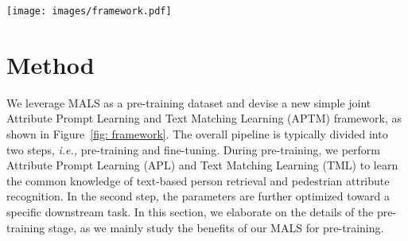 \documentclass[sigconf]{acmart}
\def\ie{\emph{i.e.}}
\begin{document}
\begin{figure*}[t]
\vspace{-.1in}
\begin{center}
     \texttt{[image: images/framework.pdf]}
\end{center}
\vspace{-.2in}
      \caption{Overview of the proposed Attribute Prompt Learning and Text Matching Learning (APTM) framework for pre-training on MALS. APTM framework contains one image-attribute stream and one image-text stream with weight-shared encoders. In particular, the framework comprises three encoders, \ie, Image Encoder (), Text Encoder (), Cross Encoder (), and two MLPs-based headers.  The Image Encoder and Text Encoder are to produce the embeddings of the image and text, respectively, while the cross encoder seeks to fuse the image and text embeddings for the subsequent predictions.}\label{fig: framework}
      \vspace{-.1in}
\end{figure*}


\section{Method} \label{method}
We leverage MALS as a pre-training dataset and devise a new simple joint Attribute Prompt Learning and Text Matching Learning (APTM) framework, as shown in Figure~\ref{fig: framework}. The overall pipeline is typically divided into two steps, \emph{i.e.,} pre-training and fine-tuning.  
During pre-training, we perform Attribute Prompt Learning (APL) and Text Matching Learning (TML) to learn the common knowledge of text-based person retrieval and pedestrian attribute recognition. In the second step, the parameters are further optimized toward a specific downstream task.
In this section, we elaborate on the details of the pre-training stage, as we mainly study the benefits of our MALS for pre-training. 
\end{document}
